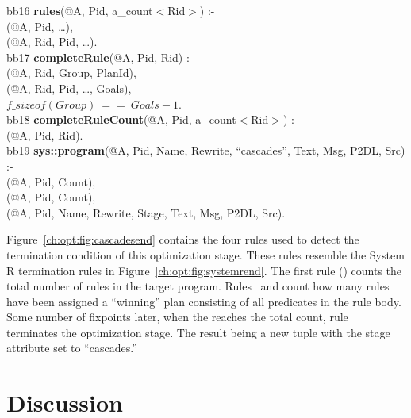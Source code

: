 \begin{figure*}
\ssp
\centering
\begin{boxedminipage}{\linewidth}
bb16 {\bf rules}(@A, Pid, a\_count$<$Rid$>$) :-\\
(@A, Pid, \ldots), \\
(@A, Rid, Pid, \ldots). \\

bb17 {\bf completeRule}(@A, Pid, Rid) :- \\
(@A, Rid, Group, PlanId), \\
(@A, Rid, Pid, \ldots, Goals), \\
\datalogspace $f\_sizeof(Group)\ ==\ Goals - 1$. \\

bb18 {\bf completeRuleCount}(@A, Pid, a\_count$<$Rid$>$) :- \\
(@A, Pid, Rid). \\

bb19 {\bf sys::program}(@A, Pid, Name, Rewrite, ``cascades'', Text, Msg, P2DL, Src) :- \\
(@A, Pid, Count), \\
(@A, Pid, Count), \\
(@A, Pid, Name, Rewrite, Stage, Text, Msg, P2DL, Src).

\end{boxedminipage}
\caption{\label{ch:opt:fig:cascadesend}Cascades termination rules.}
\end{figure*}

Figure~\ref{ch:opt:fig:cascadesend} contains the four rules used to detect the
termination condition of this optimization stage.  These rules resemble the
System R termination rules in Figure~\ref{ch:opt:fig:systemrend}.  The first
rule () counts the total number of rules in the target program.
Rules~ and  count how many rules have been assigned a
``winning'' plan consisting of all predicates in the rule body.  Some number of
fixpoints later, when the  reaches the total 
count, rule~ terminates the optimization stage.  The result being a
new  tuple with the stage attribute set to ``cascades.''

\section{Discussion}
\label{ch:opt:sec:discussion}

